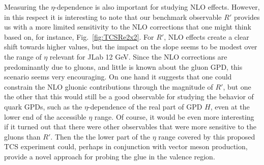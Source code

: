 Measuring the $\eta$-dependence is also important for studying NLO effects.
However, in this respect it is interesting to note that our benchmark
observable $R'$ provides us with a more limited sensitivity to the NLO
corrections that one might think based on, for instance,
Fig.~\ref{fig:TCSRe2x2}. For $R'$, NLO effects create a clear shift towards
higher values, but the impact on the slope seems to be modest over the range
of $\eta$ relevant for JLab 12 GeV.
Since the NLO corrections are predominantly due to gluons, and little is
known about the gluon GPD, this scenario seems very encouraging. On one hand
it suggests that one could constrain the NLO gluonic contributions through
the magnitude of $R'$, but one the other that this would still be a good
observable for studying the behavior of quark GPDs, such as the
$\eta$-dependence of the real part of GPD $H$, even at the lower
end of the accessible $\eta$ range.
Of course, it would be even more interesting if it turned out that there were
other observables that were more sensitive to the gluons than $R'$. Then the
the lower part of the $\eta$ range covered by this proposed TCS experiment
could, perhaps in conjunction with vector meson production, provide a novel
approach for probing the glue in the valence region.
